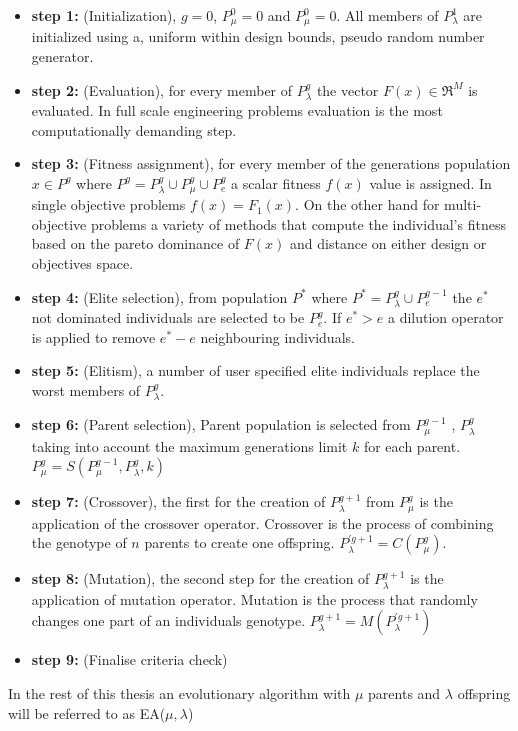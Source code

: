 \begin{itemize}
\item[]{\bf step 1:}  (Initialization), $g=0$, $P_{\mu}^0=0$ and $P_{\mu}^0=0$. All members of $P_{\lambda}^1$ are initialized using a, uniform within design bounds,  pseudo random number generator.  
\item[]{\bf step 2:}  (Evaluation), for every member of $P_{\lambda}^g$ the vector $F(x) \in \Re^{M} $ is evaluated. In full scale engineering problems evaluation is the most computationally demanding step.
\item[]{\bf step 3:}  (Fitness assignment), for every member of the generations population $x \in P^g$ where $P^g = P_{\lambda}^g \cup P_{\mu}^g \cup P_{e}^g$ a scalar fitness $f(x)$ value is assigned. In single objective problems $f(x)=F_1(x)$. On the other hand for multi-objective problems a variety of methods that compute the individual's fitness based on the pareto dominance of $F(x)$ and distance on either design or objectives space.
\item[]{\bf step 4:}  (Elite selection), from population $P^*$ where $P^*=P_{\lambda}^g \cup P_{e}^{g-1}$ the $e^*$ not dominated individuals are selected to be $P_e^g$. If $e^* > e$ a dilution operator is applied to remove $e^* - e$ neighbouring individuals.     
\item[]{\bf step 5:}  (Elitism), a number of user specified elite individuals replace the worst members of $P_{\lambda}^g$.  
\item[]{\bf step 6:}  (Parent selection), Parent population is selected from $P_{\mu}^{g-1}$ , $P_{\lambda}^g$ taking into account the maximum generations limit  $k$ for each parent. $P_{\mu}^{g}=S(P_{\mu}^{g-1},P_{\lambda}^g,k)$ 
\item[]{\bf step 7:}  (Crossover), the first for the creation of $P_{\lambda}^{g+1}$ from $P_{\mu}^{g}$ is the application of the crossover operator. Crossover is the process of combining the genotype of $n$ parents to create one offspring. $P_{\lambda}^{'g+1} = C(P_{\mu}^{g})$. 
\item[]{\bf step 8:}  (Mutation), the second step for the creation of $P_{\lambda}^{g+1}$ is the application of mutation operator. Mutation is the process that randomly changes one part of an individuals genotype. $P_{\lambda}^{g+1} = M(P_{\lambda}^{'g+1})$
\item[]{\bf step 9:}  (Finalise criteria check)
\end{itemize}
In the rest of this thesis an evolutionary algorithm with $\mu$ parents and $\lambda$ offspring will be referred to as EA($\mu,\lambda$)   

